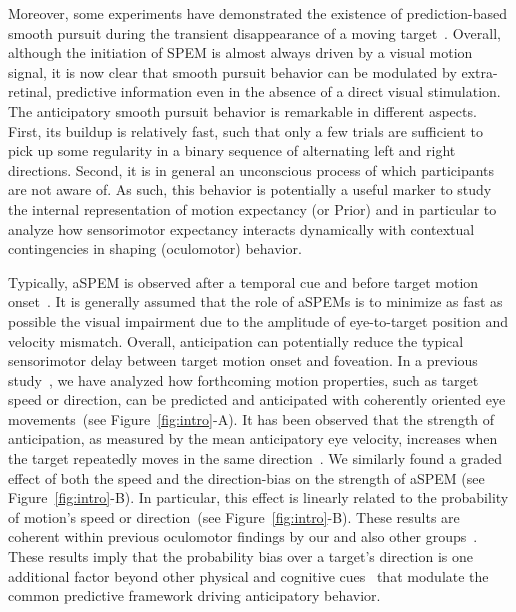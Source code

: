 \documentclass[12pt,english]{article}%
\newcommand{\citep}[1]{\parencite{#1}}
\newcommand{\seeFig}[1]{Figure~\ref{fig:#1}}
\begin{document}
Moreover, some experiments have demonstrated the existence
of prediction-based smooth pursuit during
the transient disappearance of a moving target~\citep{Badler2006,BeckerFuchs1985}.
Overall, although the initiation of SPEM is almost always driven by a visual motion signal, it is now clear that smooth pursuit behavior
can be modulated by extra-retinal, predictive information even in the absence of a direct visual stimulation.
The anticipatory smooth pursuit behavior is remarkable
in different aspects.
First, its buildup is relatively fast, such that only a few trials are sufficient
to pick up some regularity in a binary sequence of alternating left and right directions.
Second, it is in general an unconscious process
of which participants are not aware of.
As such, this behavior is potentially a useful marker
to study the internal representation of motion expectancy (or Prior) 
and in particular to analyze how sensorimotor expectancy 
interacts dynamically with contextual contingencies in shaping (oculomotor) behavior.

Typically, aSPEM is observed after a temporal cue and
before target motion onset~\citep{Kowler1979a,Kowler1979b, Kowler1984}. %
It is generally assumed that the role of aSPEMs is
to minimize as fast as possible the visual impairment due
to the amplitude of eye-to-target position and velocity mismatch.
Overall, anticipation can potentially reduce the typical sensorimotor delay
between target motion onset and foveation. In a previous study~\citep{Montagnini2010},
we have analyzed how forthcoming motion properties,
such as target speed or direction, can be
predicted and anticipated with coherently oriented eye movements~(see \seeFig{intro}-A).
It has been observed that the strength of anticipation,
as measured by the mean anticipatory eye velocity,
increases when the target repeatedly moves in the same direction~\citep{Kowler1984, Kowler1989, Heinen2005}.
We similarly found a graded effect of both the speed and the direction-bias
on the strength of aSPEM (see \seeFig{intro}-B).
In particular, this effect is linearly related
to the probability of motion's speed or direction~(see \seeFig{intro}-B).
These results are coherent within previous oculomotor findings
by our and also other groups~\citep{SantosKowler2017}.
These results imply that the probability bias over a target's direction is
one additional factor beyond other physical and cognitive cues~\citep{Kowler2014, SantosKowler2017,Damasse18}
that modulate the common predictive framework
driving anticipatory behavior.
\end{document}
